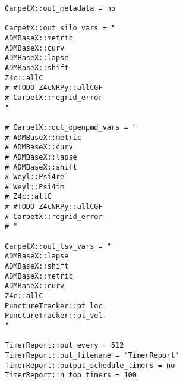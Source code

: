 \begin{verbatim}
CarpetX::out_metadata = no

CarpetX::out_silo_vars = "
ADMBaseX::metric
ADMBaseX::curv
ADMBaseX::lapse
ADMBaseX::shift
Z4c::allC
# #TODO Z4cNRPy::allCGF
# CarpetX::regrid_error
"

# CarpetX::out_openpmd_vars = "
# ADMBaseX::metric
# ADMBaseX::curv
# ADMBaseX::lapse
# ADMBaseX::shift
# Weyl::Psi4re
# Weyl::Psi4im
# Z4c::allC
# #TODO Z4cNRPy::allCGF
# CarpetX::regrid_error
# "

CarpetX::out_tsv_vars = "
ADMBaseX::lapse
ADMBaseX::shift
ADMBaseX::metric
ADMBaseX::curv
Z4c::allC
PunctureTracker::pt_loc
PunctureTracker::pt_vel
"

TimerReport::out_every = 512
TimerReport::out_filename = "TimerReport"
TimerReport::output_schedule_timers = no
TimerReport::n_top_timers = 100

\end{verbatim}

